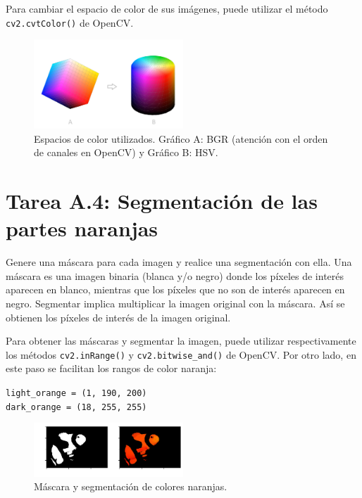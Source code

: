 Para cambiar el espacio de color de sus imágenes, puede utilizar el método \texttt{cv2.cvtColor()} de OpenCV.

\begin{figure}[h]
    \centering
    \includegraphics[width=0.5\textwidth]{Lab_2/template/figures/color_spaces.png}
    \caption{Espacios de color utilizados. Gráfico A: BGR (atención con el orden de canales en OpenCV) y Gráfico B: HSV.}
    
    \label{fig:color_spaces}
\end{figure}

\section*{Tarea A.4: Segmentación de las partes naranjas}

Genere una máscara para cada imagen y realice una segmentación con ella. Una máscara es una imagen binaria (blanca y/o negro) donde los píxeles de interés aparecen en blanco, mientras que los píxeles que no son de interés aparecen en negro. Segmentar implica multiplicar la imagen original con la máscara. Así se obtienen los píxeles de interés de la imagen original.

Para obtener las máscaras y segmentar la imagen, puede utilizar respectivamente los métodos \texttt{cv2.inRange()} y \texttt{cv2.bitwise\_and()} de OpenCV. Por otro lado, en este paso se facilitan los rangos de color naranja:

\begin{tcolorbox}[colback=gray!85, coltext=white, colframe=white, fonttitle=\bfseries, title=Important Note, boxrule=0.5mm]
\texttt{light\_orange = (1, 190, 200)}\\
\texttt{dark\_orange = (18, 255, 255)}
\end{tcolorbox}


\begin{figure}[h]
    \centering
    \includegraphics[width=0.5\textwidth]{Lab_2/template/figures/orange.png}
    \caption{Máscara y segmentación de colores naranjas.}
    \label{fig:orange_mask}
\end{figure}

